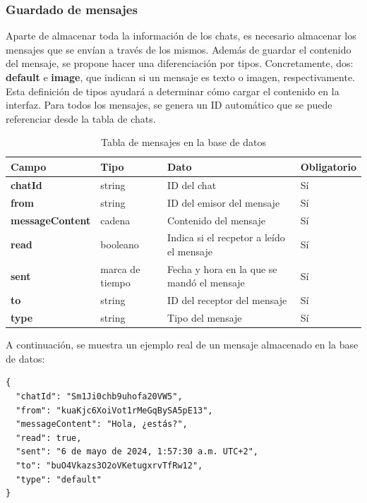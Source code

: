\documentclass[a4paper, 12pt]{article}
\begin{document}
\subsubsection{Guardado de mensajes}

Aparte de almacenar toda la información de los chats, es necesario almacenar los mensajes que se envían a través de los mismos. Además de guardar el contenido del mensaje, se propone hacer una diferenciación por tipos. Concretamente, dos: \textbf{default} e \textbf{image}, que indican si un mensaje es texto o imagen, respectivamente. Esta definición de tipos ayudará a determinar cómo cargar el contenido en la interfaz. Para todos los mensajes, se genera un ID automático que se puede referenciar desde la tabla de chats.

\begin{table}[H]

\label{tab:messages}
	\begin{tabular}{|m{3.2cm}|m{2cm}|m{5cm}|m{3cm}|}
	\hline
	\textbf{Campo} & \textbf{Tipo} & \textbf{Dato} & \textbf{Obligatorio} \\ 
	\hline
	\textbf{chatId} & string & ID del chat &  Sí \\ 
	\hline
	\textbf{from} & string & ID del emisor del mensaje &  Sí \\ 
	\hline
	\textbf{messageContent} & cadena & Contenido del mensaje &  Sí \\ 
	\hline
	\textbf{read} & booleano & Indica si el recpetor a leído el mensaje &  Sí \\ 
	\hline
	\textbf{sent} & marca de tiempo & Fecha y hora en la que se mandó el mensaje & Sí \\ 
	\hline
	\textbf{to} & string & ID del receptor del mensaje & Sí \\ 
	\hline
	\textbf{type} & string & Tipo del mensaje & Sí \\ 
	\hline
	\end{tabular}
	\caption{Tabla de mensajes en la base de datos}
\end{table}

A continuación, se muestra un ejemplo real de un mensaje almacenado en la base de datos:

\begin{verbatim}
{
  "chatId": "Sm1Ji0chb9uhofa20VW5",
  "from": "kuaKjc6XoiVot1rMeGqBySA5pE13",
  "messageContent": "Hola, ¿estás?",
  "read": true,
  "sent": "6 de mayo de 2024, 1:57:30 a.m. UTC+2",
  "to": "buO4Vkazs3O2oVKetugxrvTfRw12",
  "type": "default"
}
\end{verbatim}
\end{document}
